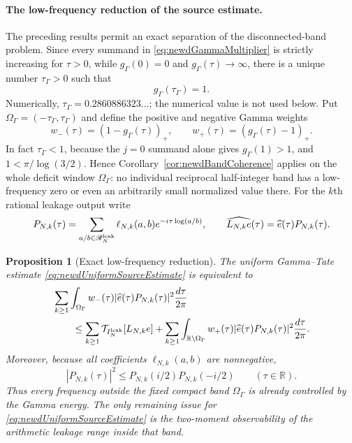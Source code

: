 \documentclass[11pt]{amsart}
\newtheorem{proposition}[theorem]{Proposition}
\theoremstyle{definition}
\theoremstyle{remark}
\newcommand{\R}{\mathbb R}
\begin{document}
\paragraph{The low-frequency reduction of the source estimate.}
The preceding results permit an exact separation of the disconnected-band
problem.  Since every summand in \eqref{eq:newdGammaMultiplier} is strictly
increasing for $\tau>0$, while $g_\Gamma(0)=0$ and
$g_\Gamma(\tau)\to\infty$, there is a unique number
$\tau_\Gamma>0$ such that
\begin{equation}\label{eq:newdGammaCutoff}
 g_\Gamma(\tau_\Gamma)=1.
\end{equation}
Numerically, $\tau_\Gamma=0.2860886323\ldots$; the numerical value is not
used below.  Put $\Omega_\Gamma=(-\tau_\Gamma,\tau_\Gamma)$ and define the
positive and negative Gamma weights
\[
 w_-(\tau)=(1-g_\Gamma(\tau))_+,
 \qquad
 w_+(\tau)=(g_\Gamma(\tau)-1)_+.
\]
In fact $\tau_\Gamma<1$, because the $j=0$ summand alone gives
$g_\Gamma(1)>1$, and $1<\pi/\log(3/2)$.  Hence
Corollary~\ref{cor:newdBandCoherence} applies on the whole deficit window
$\Omega_\Gamma$: no individual reciprocal half-integer band has a
low-frequency zero or even an arbitrarily small normalized value there.
For the $k$th rational leakage output write
\begin{equation}\label{eq:newdLeakagePolynomial}
 P_{N,k}(\tau)=
 \sum_{a/b\in\mathscr R_N^{\rm leak}}
 \ell_{N,k}(a,b)e^{-i\tau\log(a/b)},
 \qquad
 \widehat{L_{N,k}e}(\tau)=\widehat e(\tau)P_{N,k}(\tau).
\end{equation}

\begin{proposition}[Exact low-frequency reduction]
\label{prop:newdLowFrequencyReduction}
The uniform Gamma--Tate estimate
\eqref{eq:newdUniformSourceEstimate} is equivalent to
\begin{align}
 &\sum_{k\geq1}\int_{\Omega_\Gamma}
    w_-(\tau)|\widehat e(\tau)P_{N,k}(\tau)|^2
       \frac{d\tau}{2\pi}                                \notag\\
 &\qquad\leq
 \sum_{k\geq1}\mathcal T_{I_N^{\rm leak}}[L_{N,k}e]
 +\sum_{k\geq1}\int_{\R\setminus\Omega_\Gamma}
    w_+(\tau)|\widehat e(\tau)P_{N,k}(\tau)|^2
       \frac{d\tau}{2\pi}.
 \label{eq:newdLowFrequencyObservability}
\end{align}
Moreover, because all coefficients
$\ell_{N,k}(a,b)$ are nonnegative,
\begin{equation}\label{eq:newdPositiveCoefficientEnvelope}
 |P_{N,k}(\tau)|^2
 \leq P_{N,k}(i/2)P_{N,k}(-i/2)
 \qquad(\tau\in\R).
\end{equation}
Thus every frequency outside the fixed compact band
$\Omega_\Gamma$ is already controlled by the Gamma energy.  The only remaining
issue for \eqref{eq:newdUniformSourceEstimate} is the two-moment
observability of the arithmetic leakage range inside that band.
\end{proposition}
\end{document}
